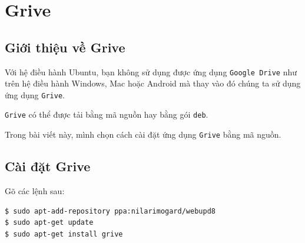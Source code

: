 \section{Grive}
\subsection{Giới thiệu về Grive}
\begin{list}{--}{}
\item Với hệ điều hành Ubuntu, bạn không sử dụng được ứng dụng \verb|Google Drive| như trên hệ điều hành Windows, Mac hoặc Android mà thay vào đó chúng ta sử dụng ứng dụng \verb|Grive|.
\item \verb|Grive| có thể được tải bằng mã nguồn hay bằng gói \verb|deb|.
\item Trong bài viết này, mình chọn cách cài đặt ứng dụng \verb|Grive| bằng mã nguồn.
\end{list}
\subsection{Cài đặt Grive}
\begin{list}{--}{}
\item[] Gõ các lệnh sau:
\begin{lstlisting}[language=bash]
$ sudo apt-add-repository ppa:nilarimogard/webupd8
$ sudo apt-get update
$ sudo apt-get install grive
\end{lstlisting}
\end{list}
